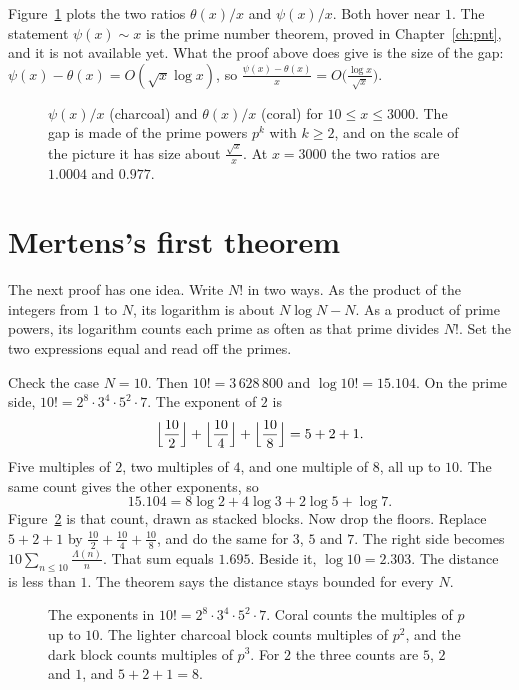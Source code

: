 Figure~\ref{fig:chebyshev} plots the two ratios $\theta(x)/x$ and $\psi(x)/x$. Both hover near $1$. The statement $\psi(x)\sim x$ is the prime number theorem, proved in Chapter~\ref{ch:pnt}, and it is not available yet. What the proof above does give is the size of the gap: $\psi(x)-\theta(x)=O(\sqrt x\log x)$, so $\frac{\psi(x)-\theta(x)}x=O\bigl(\frac{\log x}{\sqrt x}\bigr)$.

\begin{figure}[ht]
\centering
{}
\caption{$\psi(x)/x$ (charcoal) and $\theta(x)/x$ (coral) for $10\le x\le 3000$. The gap is made of the prime powers $p^k$ with $k\ge 2$, and on the scale of the picture it has size about $\frac{\sqrt x}x$. At $x=3000$ the two ratios are $1.0004$ and $0.977$.}
\label{fig:chebyshev}
\end{figure}

\section{Mertens's first theorem}

The next proof has one idea. Write $N!$ in two ways. As the product of the integers from $1$ to $N$, its logarithm is about $N\log N-N$. As a product of prime powers, its logarithm counts each prime as often as that prime divides $N!$. Set the two expressions equal and read off the primes.

Check the case $N=10$. Then $10!=3\,628\,800$ and $\log 10!=15.104$. On the prime side, $10!=2^8\cdot 3^4\cdot 5^2\cdot 7$. The exponent of $2$ is
\[
\Bigl\lfloor\frac{10}2\Bigr\rfloor+\Bigl\lfloor\frac{10}4\Bigr\rfloor+\Bigl\lfloor\frac{10}8\Bigr\rfloor=5+2+1.
\]
Five multiples of $2$, two multiples of $4$, and one multiple of $8$, all up to $10$. The same count gives the other exponents, so
\[
15.104=8\log 2+4\log 3+2\log 5+\log 7.
\]
Figure~\ref{fig:tenfactorial} is that count, drawn as stacked blocks. Now drop the floors. Replace $5+2+1$ by $\frac{10}2+\frac{10}4+\frac{10}8$, and do the same for $3$, $5$ and $7$. The right side becomes $10\sum_{n\le 10}\frac{\Lambda(n)}n$. That sum equals $1.695$. Beside it, $\log 10=2.303$. The distance is less than $1$. The theorem says the distance stays bounded for every $N$.

\begin{figure}[ht]
\centering
{}
\caption{The exponents in $10!=2^8\cdot 3^4\cdot 5^2\cdot 7$. Coral counts the multiples of $p$ up to $10$. The lighter charcoal block counts multiples of $p^2$, and the dark block counts multiples of $p^3$. For $2$ the three counts are $5$, $2$ and $1$, and $5+2+1=8$.}
\label{fig:tenfactorial}
\end{figure}

